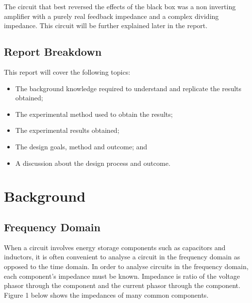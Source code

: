 \documentclass[12pt]{article} %
\begin{document}
The circuit that best reversed the effects of the black box was a non inverting amplifier with a purely real feedback impedance and a complex dividing impedance. This circuit will be further explained later in the report.

\subsection{Report Breakdown}

This report will cover the following topics:
\begin{itemize} \itemsep1pt
	\item The background knowledge required to understand and replicate the results obtained;
	\item The experimental method used to obtain the results;
	\item The experimental results obtained;
	\item The design goals, method and outcome; and
	\item A discussion about the design process and outcome.
\end{itemize}

\pagebreak





\section{Background}

\subsection{Frequency Domain}

When a circuit involves energy storage components such as capacitors and inductors, it is often convenient to analyse a circuit in the frequency domain as opposed to the time domain. In order to analyse circuits in the frequency domain, each component's impedance must be known. Impedance is ratio of the voltage phasor through the component and the current phasor through the component. Figure 1 below shows the impedances of many common components.
\end{document}
